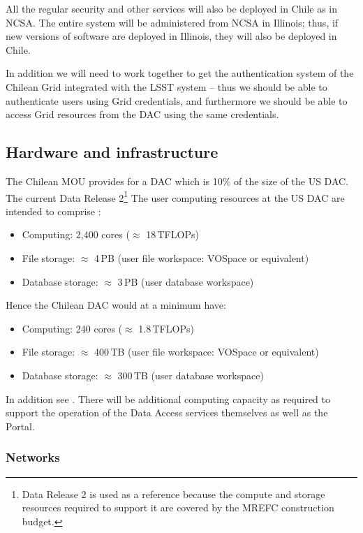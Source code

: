 All the regular security and other services will also be deployed in Chile as in NCSA.
The entire system will be administered from NCSA in Illinois; thus, if new versions of software are deployed in Illinois, they will also be deployed in Chile.

In addition we will need to work together to get the authentication system of the Chilean Grid integrated with the LSST system  -- thus we should be able to authenticate users using Grid credentials, and furthermore we should be able to access Grid resources from the DAC using the same credentials.


\subsection{Hardware and infrastructure}\label{sec:hw}

The Chilean MOU provides for a DAC which is 10\% of the size of the US DAC.
The current Data Release 2\footnote{Data Release 2 is used as a reference because the compute and storage resources required to support it are covered by the MREFC construction budget.} The user computing resources at the US DAC are intended to comprise :
\begin{itemize}
\item Computing: 2,400 cores ($\approx$ 18\,TFLOPs)
\item File storage: $\approx$ 4\,PB  (user file workspace: VOSpace or equivalent)
\item Database storage: $\approx$ 3\,PB (user database workspace)

\end{itemize}

Hence the Chilean DAC would at a minimum have:
\begin{itemize}
\item Computing: 240 cores ($\approx$ 1.8\,TFLOPs)
\item File storage: $\approx$ 400\,TB  (user file workspace: VOSpace or equivalent)
\item Database storage: $\approx$ 300\,TB (user database workspace)

\end{itemize}

In addition see .
There will be additional computing capacity as required to support the operation of the Data Access services themselves as well as the Portal.


\subsubsection{Networks}

